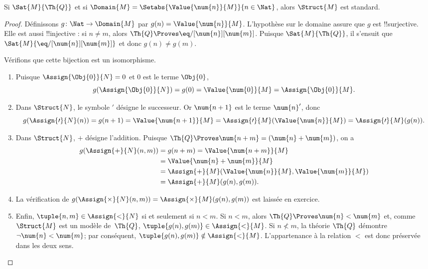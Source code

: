 \documentclass[../../../include/open-logic-section]{subfiles}
\begin{document}
\begin{prop}
Si $\Sat{M}{\Th{Q}}$ et si
$\Domain{M}=
\Setabs{\Value{\num{n}}{M}}{n\in\Nat}$,
alors $\Struct{M}$ est standard.
\end{prop}

\begin{proof}
Définissons $g\colon\Nat\to\Domain{M}$ par
$g(n)=\Value{\num{n}}{M}$. L'hypothèse sur le
domaine assure que $g$ est !!{surjective}.
Elle est aussi !!{injective} : si $n\neq m$,
alors $\Th{Q}\Proves\eq/[\num{n}][\num{m}]$.
Puisque $\Sat{M}{\Th{Q}}$, il s'ensuit que
$\Sat{M}{\eq/[\num{n}][\num{m}]}$ et donc
$g(n)\neq g(m)$.

Vérifions que cette bijection est un isomorphisme.
\begin{enumerate}
\item Puisque $\Assign{\Obj{0}}{N}=0$ et
  $\num{0}$ est le terme $\Obj{0}$,
  \[
    g(\Assign{\Obj{0}}{N})=g(0)
    =\Value{\num{0}}{M}=\Assign{\Obj{0}}{M}.
  \]
\item Dans $\Struct{N}$, le symbole $\prime$ désigne
  le successeur. Or $\num{n+1}$ est le terme
  $\num{n}'$, donc
  \[
    g(\Assign{\prime}{N}(n))
    =g(n+1)=\Value{\num{n+1}}{M}
    =\Assign{\prime}{M}(\Value{\num{n}}{M})
    =\Assign{\prime}{M}(g(n)).
  \]
\item Dans $\Struct{N}$, $+$ désigne l'addition.
  Puisque
  $\Th{Q}\Proves\num{n+m}=(\num{n}+\num{m})$,
  on a
  \begin{align*}
    g(\Assign{+}{N}(n,m))
      &=g(n+m)=\Value{\num{n+m}}{M}\\
      &=\Value{\num{n}+\num{m}}{M}\\
      &=\Assign{+}{M}(
          \Value{\num{n}}{M},\Value{\num{m}}{M})\\
      &=\Assign{+}{M}(g(n),g(m)).
  \end{align*}
\item La vérification de
  $g(\Assign{\times}{N}(n,m))
  =\Assign{\times}{M}(g(n),g(m))$
  est laissée en exercice.
\item Enfin,
  $\tuple{n,m}\in\Assign{<}{N}$ si et seulement
  si $n<m$. Si $n<m$, alors
  $\Th{Q}\Proves\num{n}<\num{m}$ et,
  comme $\Struct{M}$ est un modèle de~$\Th{Q}$,
  $\tuple{g(n),g(m)}\in\Assign{<}{M}$.
  Si $n\not<m$, la théorie $\Th{Q}$ démontre
  $\lnot\num{n}<\num{m}$; par conséquent,
  $\tuple{g(n),g(m)}\notin\Assign{<}{M}$.
  L'appartenance à la relation $<$ est donc
  préservée dans les deux sens.
\end{enumerate}
\end{proof}
\end{document}
